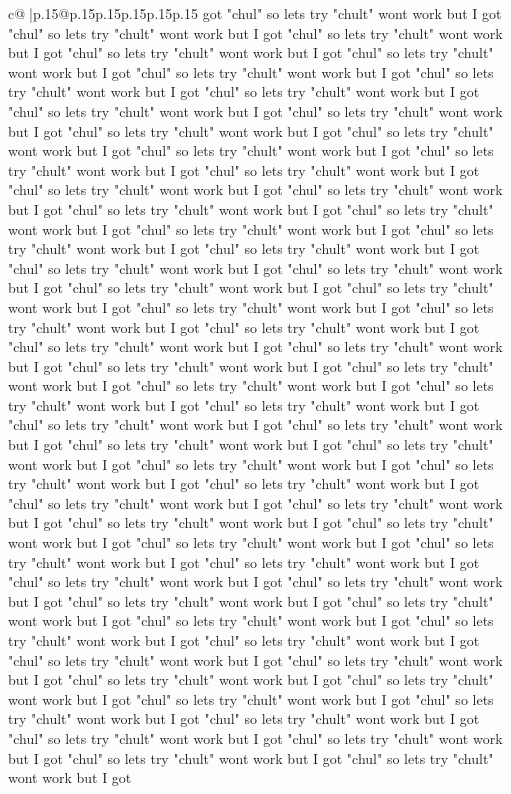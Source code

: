 \documentclass{article}
\begin{document}
{\begin{supertabular}{c@{$\;$}|p{.15\linewidth}@{}p{.15\linewidth}p{.15\linewidth}p{.15\linewidth}p{.15\linewidth}p{.15\linewidth}}
{{{got "chul" so lets try "chult" wont work but I got "chul" so lets try "chult" wont work but I got "chul" so lets try "chult" wont work but I got "chul" so lets try "chult" wont work but I got "chul" so lets try "chult" wont work but I got "chul" so lets try "chult" wont work but I got "chul" so lets try "chult" wont work but I got "chul" so lets try "chult" wont work but I got "chul" so lets try "chult" wont work but I got "chul" so lets try "chult" wont work but I got "chul" so lets try "chult" wont work but I got "chul" so lets try "chult" wont work but I got "chul" so lets try "chult" wont work but I got "chul" so lets try "chult" wont work but I got "chul" so lets try "chult" wont work but I got "chul" so lets try "chult" wont work but I got "chul" so lets try "chult" wont work but I got "chul" so lets try "chult" wont work but I got "chul" so lets try "chult" wont work but I got "chul" so lets try "chult" wont work but I got "chul" so lets try "chult" wont work but I got "chul" so lets try "chult" wont work but I got "chul" so lets try "chult" wont work but I got "chul" so lets try "chult" wont work but I got "chul" so lets try "chult" wont work but I got "chul" so lets try "chult" wont work but I got "chul" so lets try "chult" wont work but I got "chul" so lets try "chult" wont work but I got "chul" so lets try "chult" wont work but I got "chul" so lets try "chult" wont work but I got "chul" so lets try "chult" wont work but I got "chul" so lets try "chult" wont work but I got "chul" so lets try "chult" wont work but I got "chul" so lets try "chult" wont work but I got "chul" so lets try "chult" wont work but I got "chul" so lets try "chult" wont work but I got "chul" so lets try "chult" wont work but I got "chul" so lets try "chult" wont work but I got "chul" so lets try "chult" wont work but I got "chul" so lets try "chult" wont work but I got "chul" so lets try "chult" wont work but I got "chul" so lets try "chult" wont work but I got "chul" so lets try "chult" wont work but I got "chul" so lets try "chult" wont work but I got "chul" so lets try "chult" wont work but I got "chul" so lets try "chult" wont work but I got "chul" so lets try "chult" wont work but I got "chul" so lets try "chult" wont work but I got "chul" so lets try "chult" wont work but I got "chul" so lets try "chult" wont work but I got "chul" so lets try "chult" wont work but I got "chul" so lets try "chult" wont work but I got "chul" so lets try "chult" wont work but I got "chul" so lets try "chult" wont work but I got "chul" so lets try "chult" wont work but I got "chul" so lets try "chult" wont work but I got "chul" so lets try "chult" wont work but I got "chul" so lets try "chult" wont work but I got "chul" so lets try "chult" wont work but I got "chul" so lets try "chult" wont work but I got "chul" so lets try "chult" wont work but I got "chul" so lets try "chult" wont work but I got "chul" so lets try "chult" wont work but I got "chul" so lets try "chult" wont work but I got "chul" so lets try "chult" wont work but I got "chul" so lets try "chult" wont work but I got "chul" so lets try "chult" wont work but I got "chul" so lets try "chult" wont work but I got }}}
\end{supertabular}}
\end{document}
